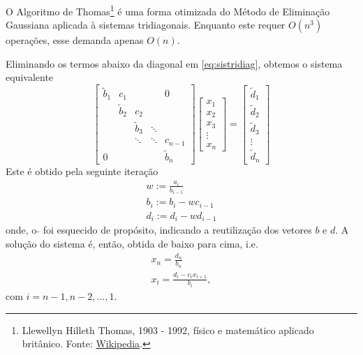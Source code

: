 O Algoritmo de Thomas\footnote{Llewellyn Hilleth Thomas, 1903 - 1992, físico e matemático aplicado britânico. Fonte: \href{https://en.wikipedia.org/wiki/Llewellyn_Thomas}{Wikipedia}.} é uma forma otimizada do Método de Eliminação Gaussiana aplicada à sistemas tridiagonais. Enquanto este requer $O(n^3)$ operações, esse demanda apenas $O(n)$.

Eliminando os termos abaixo da diagonal em \eqref{eq:sistridiag}, obtemos o sistema equivalente
\begin{equation}
  \begin{bmatrix}
    \tilde{b}_1 & c_1 & & & 0\\
      & \tilde{b}_2 & c_2 & & \\
    &  & \tilde{b}_3 & \ddots & \\
    & & \ddots & \ddots & c_{n-1}\\
    0 & & &  & \tilde{b}_n
  \end{bmatrix}
  \begin{bmatrix}
    x_1\\
    x_2\\
    x_3\\
    \vdots\\
    x_n
  \end{bmatrix} =
    \begin{bmatrix}
    \tilde{d}_1\\
    \tilde{d}_2\\
    \tilde{d}_3\\
    \vdots\\
    \tilde{d}_n
  \end{bmatrix}
\end{equation}
Este é obtido pela seguinte iteração
\begin{gather}
  w := \frac{a_i}{b_{i-1}}\\
  b_i := b_i - w c_{i-1}\\
  d_i := d_i - w d_{i-1}
\end{gather}
onde, o $\tilde{}$ foi esquecido de propósito, indicando a reutilização dos vetores $b$ e $d$. A solução do sistema é, então, obtida de baixo para cima, i.e.
\begin{gather}
  x_n = \frac{d_n}{b_n}\\
  x_i = \frac{d_i - c_ix_{i+1}}{b_i},
\end{gather}
com $i=n-1,n-2,\dotsc,1$.



